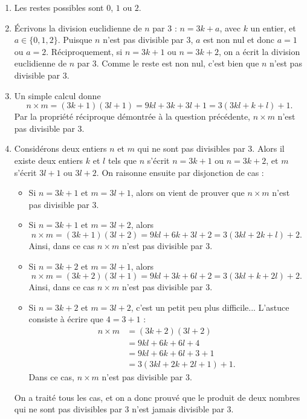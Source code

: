\documentclass[11pt,a4paper]{article}
\begin{document}
	\begin{corrige}
		\begin{enumerate}
			
			\item  Les restes possibles sont $0$, $1$ ou $2$. 
			
			\item  Écrivons la division euclidienne de $n$ par $3$ : $n=3k+a$, avec $k$ un entier, et $a\in\{0,1,2\}$. Puisque $n$ n'est pas divisible par $3$, $a$ est non nul et donc $a=1$ ou $a=2$. Réciproquement, si $n=3k+1$ ou $n=3k+2$, on a écrit la division euclidienne de $n$ par 3. Comme le reste est non nul, c'est bien que $n$ n'est pas divisible par $3$.
			
			\item  Un simple calcul donne 
			$$n\times m=(3k+1)(3l+1)=9kl+3k+3l+1=3(3kl+k+l)+1.$$
			Par la propriété réciproque démontrée à la question précédente, $n\times m$ n'est pas divisible par 3.
			
			\item  Considérons deux entiers $n$ et $m$ qui ne sont pas divisibles par $3$. Alors il existe deux entiers $k$ et $l$ tels que $n$ s'écrit $n=3k+1$ ou $n=3k+2$, et $m$ s'écrit $3l+1$ ou $3l+2$. On raisonne ensuite par disjonction de cas : 
			
			\begin{itemize}
				
				\item  Si $n=3k+1$ et $m=3l+1$, alors on vient de prouver que $n\times m$ n'est pas divisible par $3$.
				
				\item  Si $n=3k+1$ et $m=3l+2$, alors
				$$n\times m=(3k+1)(3l+2)=9kl+6k+3l+2=3(3kl+2k+l)+2.$$
				Ainsi, dans ce cas $n\times m$ n'est pas divisible par $3$.
				
				\item  Si $n=3k+2$ et $m=3l+1$, alors
				$$n\times m=(3k+2)(3l+1)=9kl+3k+6l+2=3(3kl+k+2l)+2.$$
				Ainsi, dans ce cas $n\times m$ n'est pas divisible par $3$.
				
				\item  Si $n=3k+2$ et $m=3l+2$, c'est un petit peu plus difficile... L'astuce consiste à écrire que $4=3+1$ :
				\begin{align*}
					n\times m&=(3k+2)(3l+2)\\
					&=9kl+6k+6l+4\\
					&=9kl+6k+6l+3+1\\
					&=3(3kl+2k+2l+1)+1.
				\end{align*}
				Dans ce cas, $n\times m$ n'est pas divisible par $3$.
				
			\end{itemize}
			
			On a traité tous les cas, et on a donc prouvé que le produit de deux nombres qui ne sont pas divisibles par 3 n'est jamais divisible par 3.
			
		\end{enumerate}
	\end{corrige}
	
\end{document}
